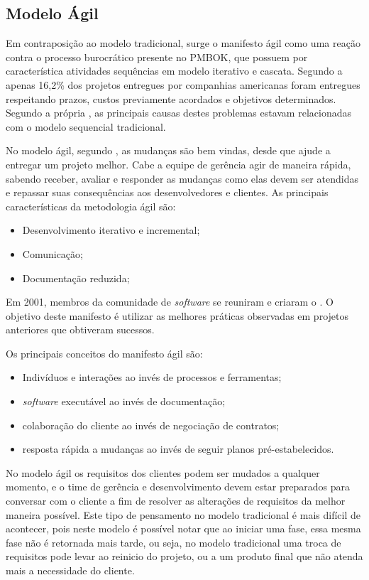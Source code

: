 \subsection{Modelo Ágil}
\label{sec:modelo_agil}

Em contraposição ao modelo tradicional, surge o manifesto ágil como uma reação contra o processo burocrático presente no PMBOK, que possuem por característica atividades sequências em modelo iterativo e cascata. Segundo a  apenas 16,2\% dos projetos entregues por companhias americanas foram entregues respeitando prazos, custos previamente acordados e objetivos determinados. Segundo a própria , as principais causas destes problemas estavam relacionadas com o modelo sequencial tradicional.

No modelo ágil, segundo , 
as mudanças são bem vindas, desde que ajude a entregar um projeto melhor. Cabe a equipe de gerência agir de maneira rápida, sabendo receber, avaliar e responder as mudanças  como elas devem ser atendidas e repassar suas consequências aos desenvolvedores e clientes. As principais características da metodologia ágil são:

\begin{itemize}
	\item Desenvolvimento iterativo e incremental;
	\item Comunicação;
	\item Documentação reduzida; 
\end{itemize}

Em 2001, membros da comunidade de \textit{software} se reuniram e criaram o . O objetivo deste manifesto é utilizar as melhores práticas observadas em projetos anteriores que obtiveram sucessos.

Os principais conceitos do manifesto ágil são:

\begin{itemize}
	\item Indivíduos e interações ao invés de processos e ferramentas;
	\item \textit{software} executável ao invés de documentação;
	\item colaboração do cliente ao invés de negociação de contratos;
	\item resposta rápida a mudanças ao invés de seguir planos pré-estabelecidos.
\end{itemize}

No modelo ágil os requisitos dos clientes podem ser mudados a qualquer momento, e o time de gerência e desenvolvimento devem estar preparados para conversar com o cliente a fim de resolver as alterações de requisitos da melhor maneira possível. Este tipo de pensamento no modelo tradicional é mais difícil de acontecer, pois neste modelo é possível notar que ao iniciar uma fase, essa mesma fase não é retornada mais tarde, ou seja, no modelo tradicional uma troca de requisitos pode levar ao reinicio do projeto, ou a um produto final que não atenda mais a necessidade do cliente.

